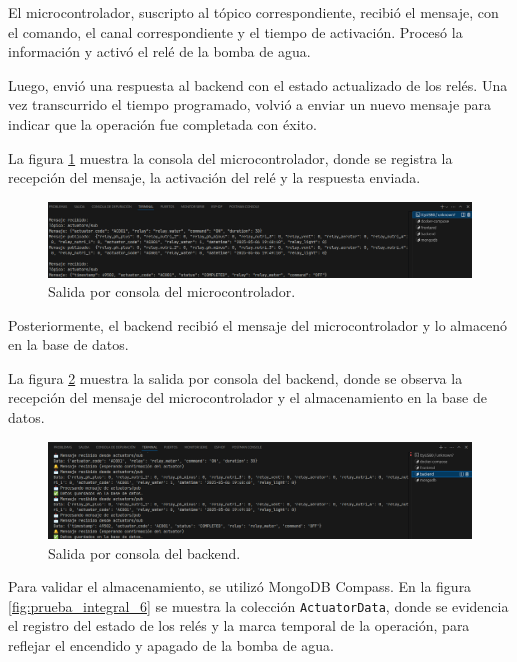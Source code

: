 El microcontrolador, suscripto al tópico correspondiente, recibió el mensaje,
con el comando, el canal correspondiente y el tiempo de activación. Procesó la
información y activó el relé de la bomba de agua.

Luego, envió una respuesta al backend con el estado actualizado de los relés.
Una vez transcurrido el tiempo programado, volvió a enviar un nuevo mensaje
para indicar que la operación fue completada con éxito.

La figura \ref{fig:prueba_integral_4} muestra la consola del microcontrolador,
donde se registra la recepción del mensaje, la activación del relé y la
respuesta enviada.

\begin{figure}[H]
    \centering
    \includegraphics[width=\textwidth]{Images/59_prueba_integral_4.png}
    \caption[Salida por consola del microcontrolador]{Salida por consola del microcontrolador.}
    \label{fig:prueba_integral_4}
\end{figure}

Posteriormente, el backend recibió el mensaje del microcontrolador y lo
almacenó en la base de datos.

La figura \ref{fig:prueba_integral_5} muestra la salida por consola del
backend, donde se observa la recepción del mensaje del microcontrolador y el
almacenamiento en la base de datos.

\begin{figure}[H]
    \centering
    \includegraphics[width=\textwidth]{Images/59_prueba_integral_5.png}
    \caption[Salida por consola del backend]{Salida por consola del backend.}
    \label{fig:prueba_integral_5}
\end{figure}

Para validar el almacenamiento, se utilizó MongoDB Compass. En la figura
\ref{fig:prueba_integral_6} se muestra la colección \texttt{ActuatorData},
donde se evidencia el registro del estado de los relés y la marca temporal de
la operación, para reflejar el encendido y apagado de la bomba de agua.

